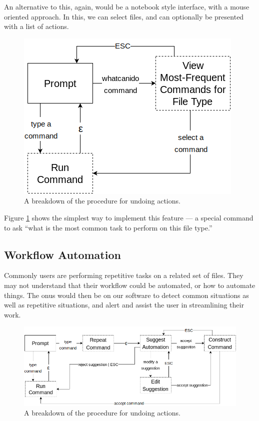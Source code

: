 An alternative to this, again, would be a notebook style interface, with a mouse
oriented approach. In this, we can select files, and can optionally be presented
with a list of actions.

\begin{figure}[H]
  \centering
  \includegraphics[width=0.8\linewidth]{figures/alternatives/file_c.png}
  \caption{A breakdown of the procedure for undoing actions.}
  \label{fig:discc}
\end{figure}

Figure \ref{fig:discc} shows the simplest way to implement this feature --- a
special command to ask ``what is the most common task to perform on this file
type.''

\subsection{Workflow Automation}

Commonly users are performing repetitive tasks on a related set of files. They
may not understand that their workflow could be automated, or how to automate
things. The onus would then be on our software to detect common situations as
well as repetitive situations, and alert and assist the user in streamlining
their work.

\begin{figure}[H]
  \centering
  \includegraphics[width=0.8\linewidth]{figures/alternatives/automate_a.png}
  \caption{A breakdown of the procedure for undoing actions.}
  \label{fig:autoa}
\end{figure}


